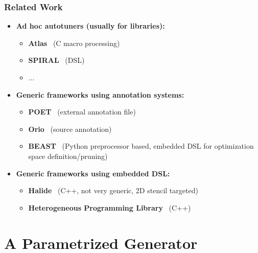 \documentclass{beamer}
\begin{document}
\begin{frame}
  \frametitle{Related Work}

  \begin{itemize}
    \item \textbf{Ad hoc autotuners (usually for libraries):}
    \begin{itemize}
      \item \textbf{Atlas}~\cite{whaley04} (C macro processing)
      \item \textbf{SPIRAL}~\cite{puschel2004spiral} (DSL)
      \item ...
    \end{itemize}
    \item \textbf{Generic frameworks using annotation systems:}
    \begin{itemize}
      \item \textbf{POET}~\cite{yi2007poet} (external annotation file)
      \item \textbf{Orio}~\cite{Hart2009:Orio} (source annotation)
      \item \textbf{BEAST}~\cite{CPE:CPE3516} (Python preprocessor based, embedded DSL for optimization space definition/pruning)
    \end{itemize}
    \item \textbf{Generic frameworks using embedded DSL:}
    \begin{itemize}
      \item \textbf{Halide}~\cite{ragan2013halide} (C++, not very generic, 2D stencil targeted)
      \item \textbf{Heterogeneous Programming Library}~\cite{F.Fabeiro:2016:WPM:2894387.2894576} (C++)
    \end{itemize}
  \end{itemize}

\end{frame}

\section{A Parametrized Generator}
\end{document}
